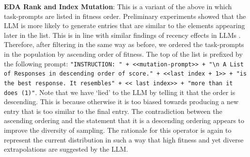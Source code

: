 \documentclass{article} %
\newcommand{\prompt}[1]{\footnotesize{\texttt{"#1"}}\normalsize}
\begin{document}
\textbf{EDA Rank and Index Mutation}: This is a variant of the above in which task-prompts are listed in fitness order. Preliminary experiments showed that the LLM is more likely to generate entries that are similar to the elements appearing later in the list. This is in line with similar findings of recency effects in LLMs \citep{DBLP:journals/corr/abs-2307-03172}. Therefore, after filtering in the same way as before, we ordered the task-prompts in the population by ascending order of fitness. The top of the list is prefixed by the following prompt: \prompt{INSTRUCTION: " + <<mutation-prompt>> + "\textbackslash n A List of Responses in descending order of score." +  <<last index + 1>> + "is the best response. It resembles" + << last index>> + "more than it does (1)}. Note that we have `lied' to the LLM by telling it that the order is descending. This is because otherwise it is too biased towards producing a new entry that is too similar to the final entry. The contradiction between the ascending ordering and the statement that it is a descending ordering appears to improve the diversity of sampling. The rationale for this operator is again to represent the current distribution in such a way that high fitness and yet diverse extrapolations are suggested by the LLM.  
\end{document}
